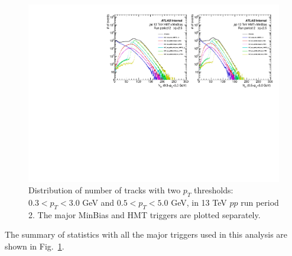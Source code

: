 \begin{figure}[H]
\centering
\includegraphics[width=.9\linewidth]{figs/sec_evtSlc/trkDis_pp13_run2.pdf}
\caption{Distribution of number of tracks with two $p_{T}$ thresholds: $0.3<p_{T}<3.0$ GeV and $0.5<p_{T}<5.0$ GeV, in 13 TeV $pp$ run period 2. The major MinBias and HMT triggers are plotted separately.}
\label{fig:trkDis_pp13_run2}
\end{figure}
The summary of statistics with all the major triggers used in this analysis are shown in Fig.~\ref{fig:trkDis_pp13_run2}.

